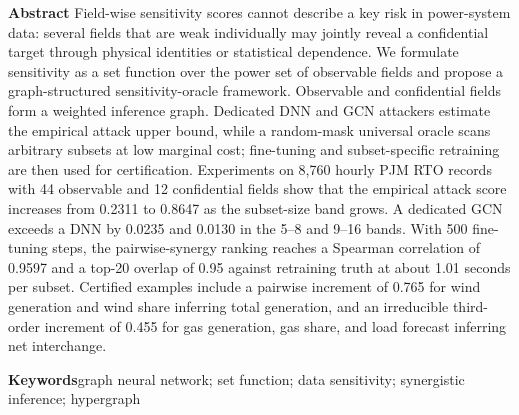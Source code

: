 \vspace{3mm}
{\setlength{\baselineskip}{17pt}\selectfont
\noindent\textbf{Abstract}\quad
Field-wise sensitivity scores cannot describe a key risk in power-system data: several fields that are weak individually may jointly reveal a confidential target through physical identities or statistical dependence. We formulate sensitivity as a set function over the power set of observable fields and propose a graph-structured sensitivity-oracle framework. Observable and confidential fields form a weighted inference graph. Dedicated DNN and GCN attackers estimate the empirical attack upper bound, while a random-mask universal oracle scans arbitrary subsets at low marginal cost; fine-tuning and subset-specific retraining are then used for certification. Experiments on 8,760 hourly PJM RTO records with 44 observable and 12 confidential fields show that the empirical attack score increases from 0.2311 to 0.8647 as the subset-size band grows. A dedicated GCN exceeds a DNN by 0.0235 and 0.0130 in the 5--8 and 9--16 bands. With 500 fine-tuning steps, the pairwise-synergy ranking reaches a Spearman correlation of 0.9597 and a top-20 overlap of 0.95 against retraining truth at about 1.01 seconds per subset. Certified examples include a pairwise increment of 0.765 for wind generation and wind share inferring total generation, and an irreducible third-order increment of 0.455 for gas generation, gas share, and load forecast inferring net interchange.\par}

\vspace{2mm}
\noindent\textbf{Keywords}\quad graph neural network; set function; data sensitivity; synergistic inference; hypergraph
\vspace{7mm}
